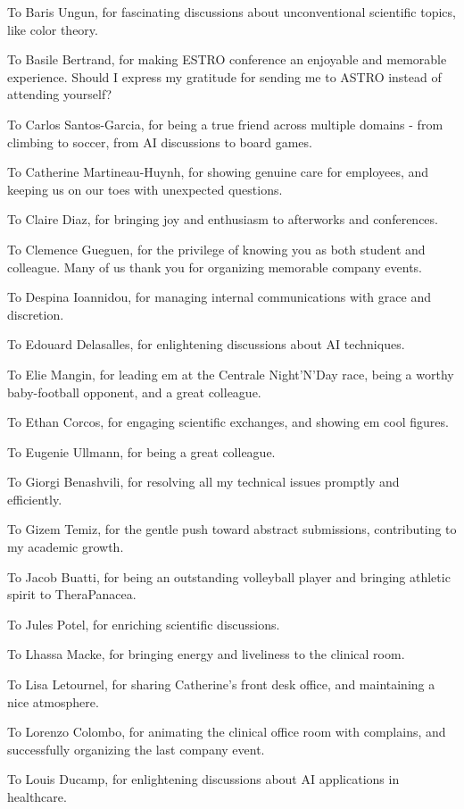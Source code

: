 To Baris Ungun, for fascinating discussions about unconventional scientific topics, like color theory.

To Basile Bertrand, for making ESTRO conference an enjoyable and memorable experience.
Should I express my gratitude for sending me to ASTRO instead of attending yourself?

To Carlos Santos-Garcia, for being a true friend across multiple domains - from climbing to soccer, from AI discussions to board games.

To Catherine Martineau-Huynh, for showing genuine care for employees, and keeping us on our toes with unexpected questions.

To Claire Diaz, for bringing joy and enthusiasm to afterworks and conferences.

To Clemence Gueguen, for the privilege of knowing you as both student and colleague.
Many of us thank you for organizing memorable company events.

To Despina Ioannidou, for managing internal  communications with grace and discretion.

To Edouard Delasalles, for enlightening discussions about AI techniques.

To Elie Mangin, for leading em at the Centrale Night'N'Day race, being a worthy baby-football opponent, and a great colleague.

To Ethan Corcos, for engaging scientific exchanges, and showing em cool figures.

To Eugenie Ullmann, for being a great colleague.

To Giorgi Benashvili, for resolving all my technical issues promptly and efficiently.

To Gizem Temiz, for the gentle push toward abstract submissions, contributing to my academic growth.

To Jacob Buatti, for being an outstanding volleyball player and bringing athletic spirit to TheraPanacea.

To Jules Potel, for enriching scientific discussions.

To Lhassa Macke, for bringing energy and liveliness to the clinical room.

To Lisa Letournel, for sharing Catherine's front desk office, and maintaining a nice atmosphere.

To Lorenzo Colombo, for animating the clinical office room with complains, and successfully organizing the last company event.

To Louis Ducamp, for enlightening discussions about AI applications in healthcare.

